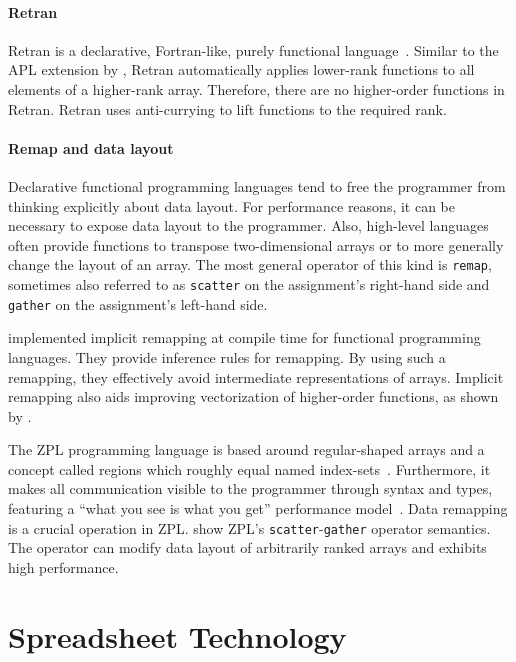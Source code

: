 \documentclass[a4paper]{article}
\begin{document}
\paragraph{Retran}

Retran is a declarative, Fortran-like, purely functional
language~\cite{367042}. Similar to the APL extension by
\citet{Lowney:1981:CAI:567532.567533}, Retran automatically applies
lower-rank functions to all elements of a higher-rank
array. Therefore, there are no higher-order functions in
Retran. Retran uses anti-currying to lift functions to the required
rank.

\paragraph{Remap and data layout}

Declarative functional programming languages tend to free the
programmer from thinking explicitly about data layout. For performance
reasons, it can be necessary to expose data layout to the
programmer. Also, high-level languages often provide functions to
transpose two-dimensional arrays or to more generally change the
layout of an array. The most general operator of this kind is
\texttt{remap}, sometimes also referred to as \texttt{scatter} on the
assignment's right-hand side and \texttt{gather} on the assignment's
left-hand side.

\citet{Walinsky:1990:FPL:91556.91610} implemented implicit remapping
at compile time for functional programming languages. They provide
inference rules for remapping. By using such a remapping, they
effectively avoid intermediate representations of arrays. Implicit
remapping also aids improving vectorization of higher-order functions,
as shown by \citet{Sinkarovs:2013:SDL:2502323.2502332}.

The ZPL programming language is based around regular-shaped arrays and
a concept called regions which roughly equal named
index-sets~\cite{Chamberlain1999Regions}. Furthermore, it makes all
communication visible to the programmer through syntax and types,
featuring a ``what you see is what you get'' performance
model~\cite{Chamberlain1998ZPLs}. Data remapping is a crucial
operation in ZPL.\@ \citet{Deitz:2003:DIP:781498.781526} show ZPL's
\texttt{scatter}-\texttt{gather} operator semantics. The operator can
modify data layout of arbitrarily ranked arrays and exhibits high
performance.

\section{Spreadsheet Technology}
\label{sec:spreadsheet-end-user-dev}
\end{document}
